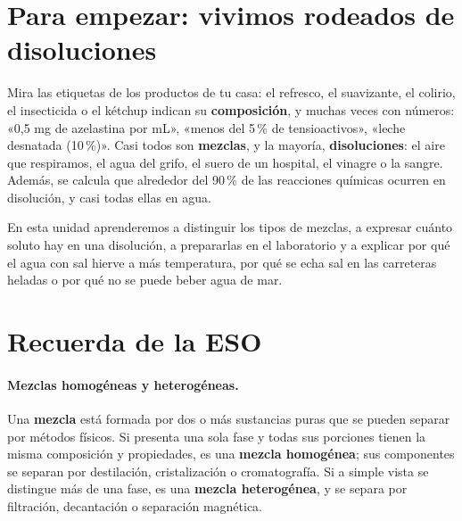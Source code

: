 
\section*{Para empezar: vivimos rodeados de disoluciones}

Mira las etiquetas de los productos de tu casa: el refresco, el suavizante, el colirio, el insecticida o el kétchup indican su
\textbf{composición}, y muchas veces con números: «0,5 mg de azelastina por mL», «menos del 5\,\% de tensioactivos»,
«leche desnatada (10\,\%)». Casi todos son \textbf{mezclas}, y la mayoría, \textbf{disoluciones}: el aire que respiramos, el
agua del grifo, el suero de un hospital, el vinagre o la sangre. Además, se calcula que alrededor del 90\,\% de las reacciones
químicas ocurren en disolución, y casi todas ellas en agua.

En esta unidad aprenderemos a distinguir los tipos de mezclas, a expresar cuánto soluto hay en una disolución, a prepararlas en
el laboratorio y a explicar por qué el agua con sal hierve a más temperatura, por qué se echa sal en las carreteras heladas o por
qué no se puede beber agua de mar.

\section{Recuerda de la ESO}\label{sec:ud2-eso}

\paragraph{Mezclas homogéneas y heterogéneas.} Una \textbf{mezcla} está formada por dos o más sustancias puras que se pueden
separar por métodos físicos. Si presenta una sola fase y todas sus porciones tienen la misma composición y propiedades, es una
\textbf{mezcla homogénea}; sus componentes se separan por destilación, cristalización o cromatografía. Si a simple vista se
distingue más de una fase, es una \textbf{mezcla heterogénea}, y se separa por filtración, decantación o separación magnética.

